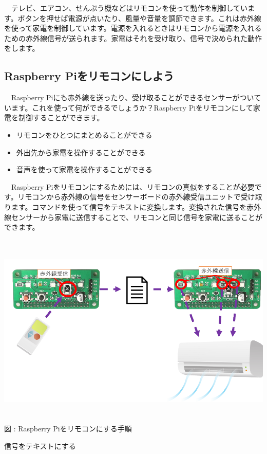 \documentclass[a4paper,dvipdfmx]{jarticle}
\newcounter{qwerty}
\renewcommand\theqwerty{\arabic{qwerty}}
\begin{document}
\bigskip

　テレビ、エアコン、せんぷう機などはリモコンを使って動作を制御しています。ボタンを押せば電源が点いたり、風量や音量を調節できます。これは赤外線を使って家電を制御しています。電源を入れるときはリモコンから電源を入れるための赤外線信号が送られます。家電はそれを受け取り、信号で決められた動作をします。

\clearpage\subsection[Raspberry Piをリモコンにしよう]{\rmfamily Raspberry
Piをリモコンにしよう}
　Raspberry
Piにも赤外線を送ったり、受け取ることができるセンサーがついています。これを使って何ができるでしょうか？Raspberry
Piをリモコンにして家電を制御することができます。

\begin{itemize}
\item
リモコンをひとつにまとめることができる
\item
外出先から家電を操作することができる
\item
音声を使って家電を操作することができる
\end{itemize}
　Raspberry
Piをリモコンにするためには、リモコンの真似をすることが必要です。リモコンから赤外線の信号をセンサーボードの赤外線受信ユニットで受け取ります。コマンドを使って信号をテキストに変換します。変換された信号を赤外線センサーから家電に送信することで、リモコンと同じ信号を家電に送ることができます。


\bigskip



\centering
\begin{minipage}{17.006cm}
{\upshape
 \includegraphics[width=17.006cm,height=9.368cm]{text05-img/text05-img040.png} \newline
図 \stepcounter{qwerty}{\theqwerty}: Raspberry
Piをリモコンにする手順}
\begin{minipage}{3.731cm}
信号をテキストにする
\end{minipage}\end{minipage}
\end{document}
